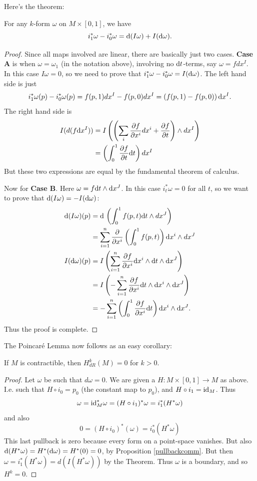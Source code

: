 \documentclass[11pt, english]{article}
\begin{document}
Here's the theorem:
\begin{thm}
 For any $k$-form $\omega$ on $M \times [0,1]$, we have
\[
i_1^\ast \omega - i_0^\ast \omega = \mathrm{d}{(}I\omega) + I(\mathrm{d}{\omega}).
\]
\end{thm}
\begin{proof}
 Since all maps involved are linear, there are basically just two cases. \textbf{Case A} is when $\omega= \omega_1$ (in the notation above), involving no $\mathrm{d}{t}$-terms, say $\omega = f dx^I$. In this case $I\omega =0$, so we need to prove that $i_1^\ast \omega - i_0^\ast \omega = I(\mathrm{d}{\omega})$. The left hand side is just
\[
i_1^\ast \omega(p) - i_0^\ast \omega(p) = f(p,1) dx^I - f(p,0) dx^I=\left(f(p,1)-f(p,0)\right) \mathrm{d}{x}^I.
\]
The right hand side is
\begin{align*}
I(d(f \mathrm{d}{x}^I)) &= I\left(\left( \sum_i \frac{\partial {f}}{\partial {x^i}} dx^i + \frac{\partial {f}}{\partial {t}}\right) \wedge dx^I\right) \\
&=\left( \int_0^1 \frac{\partial {f}}{\partial {t}} \mathrm{d}{t} \right) dx^I
\end{align*}
But these two expressions are equal by the fundamental theorem of calculus.

Now for \textbf{Case B}. Here $\omega = f \mathrm{d}{t} \wedge \mathrm{d}{x}^J$. In this case $i_t^\ast \omega = 0$ for all $t$, so we want to prove that $\mathrm{d}{(}I \omega) = - I(\mathrm{d}{\omega})$:
\begin{align*}
\mathrm{d}{(}I \omega)(p) &= \mathrm{d}{\,}  \left( \int_0^1 f(p,t) \mathrm{d}{t} \wedge dx^J \right) \\
&= \sum_{i=1}^n \frac{\partial {}}{\partial {x^i}}\left( \int_0^1 f(p,t)\right) \mathrm{d}{x}^i \wedge dx^J \\
I(\mathrm{d}{\omega})(p) &= I\left(\sum_{i=1}^n \frac{\partial {f}}{\partial {x^i}} \mathrm{d}{x}^i \wedge \mathrm{d}{t} \wedge \mathrm{d}{x}^J\right) \\
&=I\left( - \sum_{i=1}^n \frac{\partial {f}}{\partial {x^i}} \mathrm{d}{t} \wedge \mathrm{d}{x}^i \wedge \mathrm{d}{x}^J\right) \\
&= -\sum_{i=1}^n \left(\int_0^1 \frac{\partial {f}}{\partial {x^i}} \mathrm{d}{t} \right) \mathrm{d}{x}^i \wedge \mathrm{d}{x}^J.
\end{align*}
Thus the proof is complete.
\end{proof}

The Poincaré Lemma now follows as an easy corollary:
\begin{lemma}

If $M$ is contractible, then $H^k_{dR}(M)=0$ for $k > 0$. 
\end{lemma}

\begin{proof}
Let $\omega$ be such that $d \omega =0$.  We are given a $H:M \times [0,1] \to M$ as above. I.e. such that $H \circ i_0 = p_0$ (the constant map to $p_0$), and $H \circ i_1 = \text{id}_M$. Thus \[\omega = \text{id}_M^\ast \omega = (H \circ i_1)^\ast \omega = i_1^\ast (H^\ast \omega) \] and also \[ 0 = (H \circ i_0)^\ast(\omega) = i_0^\ast (H^\ast \omega)\] 
This last pullback is zero because every form on a point-space vanishes. But also $\mathrm{d}{(}H^\ast \omega) = H^\ast( \mathrm{d}{\omega})=H^\ast(0)=0$, by Proposition \ref{pullbackcomm}. 
But then $\omega = i_1^\ast(H^\ast \omega) = d(I(H^\ast \omega))$ by the Theorem. Thus $\omega$ is a boundary, and so $H^k=0$. 
\end{proof}
\end{document}
